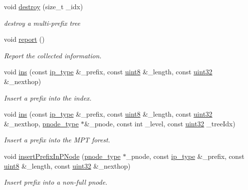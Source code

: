 \begin{DoxyCompactItemize}
void \hyperlink{classRMPTree_ac59486bc75a65d7ee31e1d54cd64162e}{destroy} (size\-\_\-t \-\_\-idx)
\begin{DoxyCompactList}\small\item\em destroy a multi-\/prefix tree \end{DoxyCompactList}\item 
void \hyperlink{classRMPTree_a740480779eca4924a14f512af6e70675}{report} ()
\begin{DoxyCompactList}\small\item\em Report the collected information. \end{DoxyCompactList}\item 
void \hyperlink{classRMPTree_a97c8ca5d99c9fce9aeeddae0a2479bb2}{ins} (const \hyperlink{classRMPTree_a3dc76d54f334071d8a2bac2422db0159}{ip\-\_\-type} \&\-\_\-prefix, const \hyperlink{types_8h_a34ecedcf03a70dc91e4616212d79267d}{uint8} \&\-\_\-length, const \hyperlink{types_8h_abd01e8e67e3d94cab04ecaaf4f85ac1b}{uint32} \&\-\_\-nexthop)
\begin{DoxyCompactList}\small\item\em Insert a prefix into the index. \end{DoxyCompactList}\item 
void \hyperlink{classRMPTree_ac02e80665c49225e72e76fd4867e2c30}{ins} (const \hyperlink{classRMPTree_a3dc76d54f334071d8a2bac2422db0159}{ip\-\_\-type} \&\-\_\-prefix, const \hyperlink{types_8h_a34ecedcf03a70dc91e4616212d79267d}{uint8} \&\-\_\-length, const \hyperlink{types_8h_abd01e8e67e3d94cab04ecaaf4f85ac1b}{uint32} \&\-\_\-nexthop, \hyperlink{classRMPTree_ac37da419a61106e5996632fc83670959}{pnode\-\_\-type} $\ast$\&\-\_\-pnode, const int \-\_\-level, const \hyperlink{types_8h_abd01e8e67e3d94cab04ecaaf4f85ac1b}{uint32} \-\_\-tree\-Idx)
\begin{DoxyCompactList}\small\item\em Insert a prefix into the M\-P\-T forest. \end{DoxyCompactList}\item 
void \hyperlink{classRMPTree_a36ae5c5ba559386a2e318ad1f9d76832}{insert\-Prefix\-In\-P\-Node} (\hyperlink{classRMPTree_ac37da419a61106e5996632fc83670959}{pnode\-\_\-type} $\ast$\-\_\-pnode, const \hyperlink{classRMPTree_a3dc76d54f334071d8a2bac2422db0159}{ip\-\_\-type} \&\-\_\-prefix, const \hyperlink{types_8h_a34ecedcf03a70dc91e4616212d79267d}{uint8} \&\-\_\-length, const \hyperlink{types_8h_abd01e8e67e3d94cab04ecaaf4f85ac1b}{uint32} \&\-\_\-nexthop)
\begin{DoxyCompactList}\small\item\em Insert prefix into a non-\/full pnode. \end{DoxyCompactList}\item 

\end{DoxyCompactItemize}
